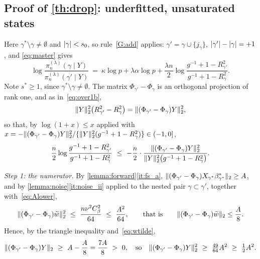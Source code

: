\subsection{Proof of \cref{th:drop}: underfitted, unsaturated states}
\label{sub:under}

Here $\gamma^{\ast}\setminus\gamma\neq\emptyset$ and $\lvert\gamma\rvert<s_0$, so
rule~\ref{G:add} applies: $\gamma'=\gamma\cup\{j_\gamma\}$,
$\lvert\gamma'\rvert-\lvert\gamma\rvert=+1$, and \eqref{eq:master} gives
\begin{equation}
    \label{eq:und1}
    \log\frac{\pi_n^{(\lambda)}(\gamma\mid Y)}
    {\pi_n^{(\lambda)}(\gamma'\mid Y)}
    \ =\ \kappa\log p+\lambda\alpha\log p
    +\frac{\lambda n}{2}
    \log\frac{g^{-1}+1-R^{2}_{\gamma'}}{g^{-1}+1-R^{2}_{\gamma}} .
\end{equation}
Note $s^{\ast}\geq1$, since $\gamma^{\ast}\setminus\gamma\neq\emptyset$.
The matrix $\Phi_{\gamma'}-\Phi_\gamma$ is an orthogonal projection of
rank one, and as in~\eqref{eq:over1b},
\begin{equation}
    \label{eq:und1b}
    \lVert Y\rVert_2^{2}\bigl(R^{2}_{\gamma'}-R^{2}_{\gamma}\bigr)
    =\lVert(\Phi_{\gamma'}-\Phi_{\gamma})Y\rVert_2^{2} ,
\end{equation}
so that, by $\log(1+x)\leq x$ applied with
$x=-\lVert(\Phi_{\gamma'}-\Phi_\gamma)Y\rVert_2^{2}/
\{\lVert Y\rVert_2^{2}(g^{-1}+1-R^{2}_\gamma)\}\in(-1,0]$,
\begin{equation}
    \label{eq:und2}
    \frac n2\log\frac{g^{-1}+1-R^{2}_{\gamma'}}
    {g^{-1}+1-R^{2}_{\gamma}}
    \ \leq\ -\frac n2\cdot
    \frac{\lVert(\Phi_{\gamma'}-\Phi_\gamma)Y\rVert_2^{2}}
    {\lVert Y\rVert_2^{2}\bigl(g^{-1}+1-R^{2}_{\gamma}\bigr)} .
\end{equation}

\emph{Step 1: the numerator.} By \cref{lemma:forward}\ref{it:fs_a},
$\lVert(\Phi_{\gamma'}-\Phi_\gamma)X_{\gamma^{\ast}}\beta^{\ast}_{\gamma^{\ast}}\rVert_2\geq A$, and by
\cref{lemma:noise}\ref{it:noise_ii} applied to the nested pair
$\gamma\subset\gamma'$, together with~\eqref{eq:Alower},
\begin{equation}
    \label{eq:und3}
    \lVert(\Phi_{\gamma'}-\Phi_\gamma)\widetilde w\rVert_2^{2}
    \ \leq\ \frac{n\nu^{2}C_\beta^{2}}{64}\ \leq\ \frac{A^{2}}{64},
    \qquad\text{that is}\qquad
    \lVert(\Phi_{\gamma'}-\Phi_\gamma)\widetilde w\rVert_2
    \leq\frac{A}{8} .
\end{equation}
Hence, by the triangle inequality and~\eqref{eq:wtilde},
\begin{equation}
    \label{eq:und4}
    \lVert(\Phi_{\gamma'}-\Phi_\gamma)Y\rVert_2
    \ \geq\ A-\frac{A}{8}=\frac{7A}{8}\ >\ 0,
    \quad\text{so}\quad
    \lVert(\Phi_{\gamma'}-\Phi_\gamma)Y\rVert_2^{2}
    \ \geq\ \tfrac{49}{64}A^{2}\ \geq\ \tfrac12A^{2} .
\end{equation}

